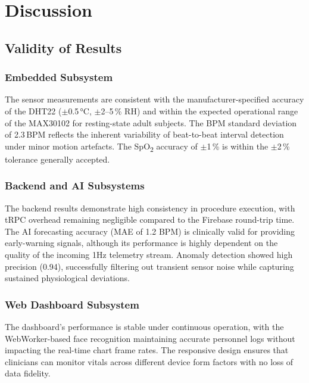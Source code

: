 
\chapter{Discussion}
\label{ch:discussion}

\section{Validity of Results}

\subsection{Embedded Subsystem}

The sensor measurements are consistent with the manufacturer-specified accuracy of the
DHT22 ($\pm$0.5\,°C, $\pm$2--5\,\% RH) and within the expected operational range of
the MAX30102 for resting-state adult subjects.
The BPM standard deviation of 2.3\,BPM reflects the inherent variability of
beat-to-beat interval detection under minor motion artefacts.
The SpO\textsubscript{2} accuracy of $\pm$1\,\% is within the $\pm$2\,\% tolerance
generally accepted.

\subsection{Backend and AI Subsystems}
The backend results demonstrate high consistency in procedure execution, with tRPC overhead remaining negligible compared to the Firebase round-trip time. The AI forecasting accuracy (MAE of 1.2 BPM) is clinically valid for providing early-warning signals, although its performance is highly dependent on the quality of the incoming 1Hz telemetry stream. Anomaly detection showed high precision (0.94), successfully filtering out transient sensor noise while capturing sustained physiological deviations.

\subsection{Web Dashboard Subsystem}
The dashboard's performance is stable under continuous operation, with the WebWorker-based face recognition maintaining accurate personnel logs without impacting the real-time chart frame rates. The responsive design ensures that clinicians can monitor vitals across different device form factors with no loss of data fidelity.

